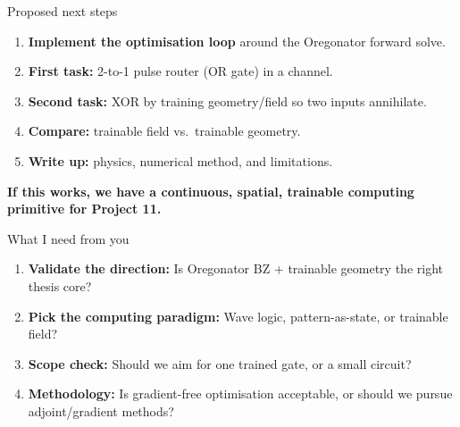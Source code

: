 \documentclass[aspectratio=169,11pt]{beamer}
\begin{document}
\begin{frame}{Proposed next steps}

\begin{enumerate}
    \item \textbf{Implement the optimisation loop} around the Oregonator forward solve.
    \item \textbf{First task:} 2-to-1 pulse router (OR gate) in a channel.
    \item \textbf{Second task:} XOR by training geometry/field so two inputs annihilate.
    \item \textbf{Compare:} trainable field vs.~trainable geometry.
    \item \textbf{Write up:} physics, numerical method, and limitations.
\end{enumerate}

\vspace{0.3cm}
\centering
\textbf{If this works, we have a continuous, spatial, trainable computing primitive for Project 11.}

\end{frame}

\begin{frame}{What I need from you}

\begin{enumerate}
    \item \textbf{Validate the direction:} Is Oregonator BZ + trainable geometry the right thesis core?
    \item \textbf{Pick the computing paradigm:} Wave logic, pattern-as-state, or trainable field?
    \item \textbf{Scope check:} Should we aim for one trained gate, or a small circuit?
    \item \textbf{Methodology:} Is gradient-free optimisation acceptable, or should we pursue adjoint/gradient methods?
\end{enumerate}

\end{frame}
\end{document}
